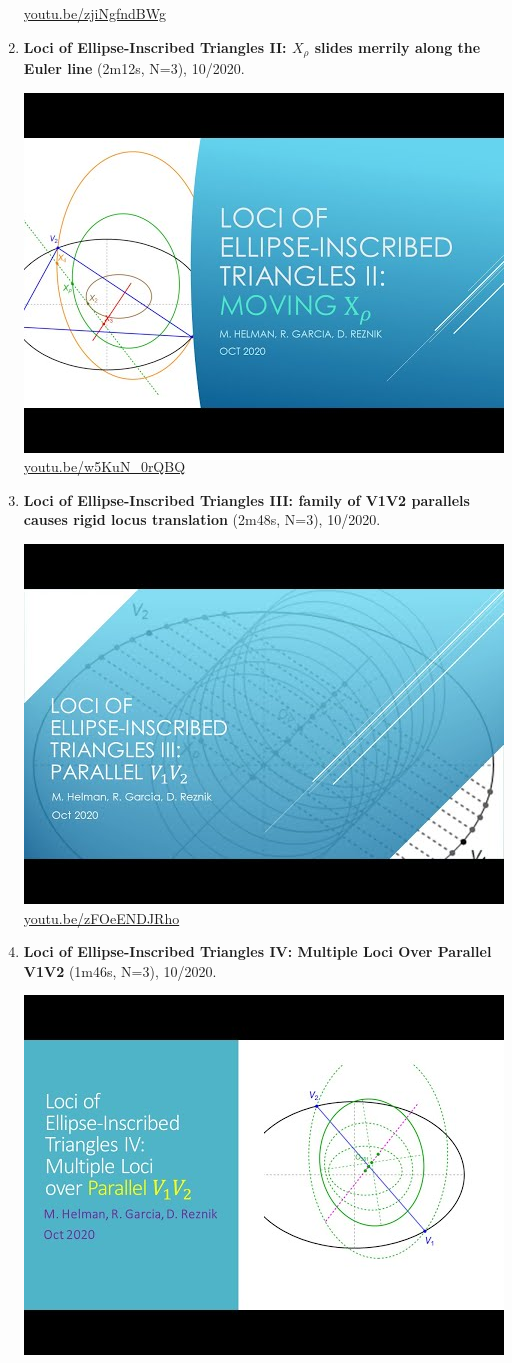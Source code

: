 \documentclass[12pt]{amsart}
\begin{document}
\begin{enumerate}[resume]
\begin{center}
\href{https://youtu.be/zjiNgfndBWg}{\url{youtu.be/zjiNgfndBWg}}\end{center}
% 
\item \textbf{Loci of Ellipse-Inscribed Triangles II: $X_\rho$ slides merrily along the Euler line} (2m12s, N=3), 10/2020. 
\begin{center}\includegraphics[width=.5\textwidth]{pics/w5KuN_0rQBQ.jpg} \\ 
\href{https://youtu.be/w5KuN_0rQBQ}{\url{youtu.be/w5KuN\_0rQBQ}}\end{center}
% 
\item \textbf{Loci of Ellipse-Inscribed Triangles III: family of V1V2 parallels causes rigid locus translation} (2m48s, N=3), 10/2020. 
\begin{center}\includegraphics[width=.5\textwidth]{pics/zFOeENDJRho.jpg} \\ 
\href{https://youtu.be/zFOeENDJRho}{\url{youtu.be/zFOeENDJRho}}\end{center}
% 
\item \textbf{Loci of Ellipse-Inscribed Triangles IV: Multiple Loci Over Parallel V1V2} (1m46s, N=3), 10/2020. 
\begin{center}\includegraphics[width=.5\textwidth]{pics/TpBjKlkFjkg.jpg} \\ 

\end{center}
\end{enumerate}
\end{document}
